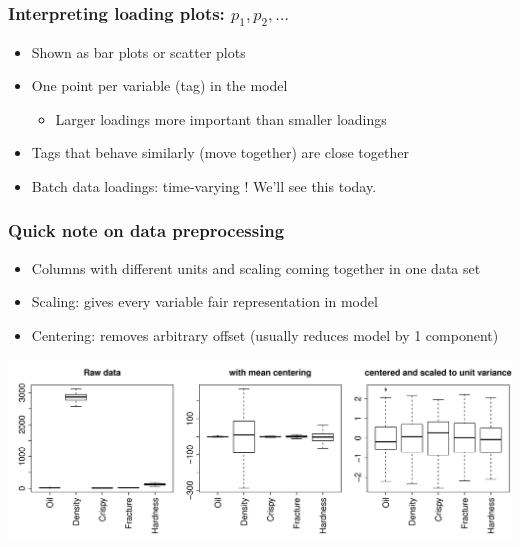 \begin{frame}\frametitle{Interpreting loading plots: \( p_1, p_2, \ldots \)}

\begin{itemize}
	
	\item	Shown as bar plots or scatter plots

	\item 	One point per variable (tag) in the model
	
			\begin{itemize}
				
				\item	Larger loadings more important than smaller loadings
				
			\end{itemize}

	\item 	Tags that behave similarly (move together) are close together 
	
	
	\item	Batch data loadings: time-varying !  We'll see this today.
	
\end{itemize}
\end{frame}

\begin{frame}\frametitle{Quick note on data preprocessing}

\begin{itemize}
	
	\item	Columns with different units and scaling coming together in one data set
	
	\item	Scaling: gives every variable fair representation in model
	
	\item	Centering: removes arbitrary offset (usually reduces model by 1 component)
	
\end{itemize}

\begin{center}
	\includegraphics[width=\textwidth]{images/pca-on-food-texture-centering-and-scaling.png}
\end{center}
\end{frame}

